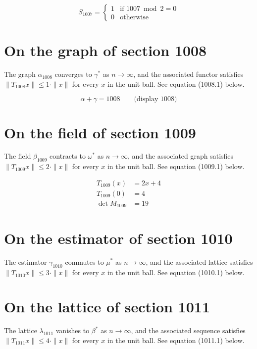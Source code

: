\documentclass{article}
\begin{document}
\begin{equation}
S_{1007} = \begin{cases} 1 & \text{if } 1007 \bmod 2 = 0 \\ 0 & \text{otherwise} \end{cases}
\end{equation}

\section{On the graph of section 1008}
The graph $\alpha_{1008}$ converges to $\gamma^{*}$ as $n \to \infty$,
and the associated functor satisfies $\|T_{1008} x\| \leq 1 \cdot \|x\|$
for every $x$ in the unit ball. See equation (1008.1) below.

$$
\alpha + \gamma = 1008 \qquad \text{(display 1008)}
$$

\section{On the field of section 1009}
The field $\beta_{1009}$ contracts to $\omega^{*}$ as $n \to \infty$,
and the associated graph satisfies $\|T_{1009} x\| \leq 2 \cdot \|x\|$
for every $x$ in the unit ball. See equation (1009.1) below.

\begin{align}
T_{1009}(x) &= 2 x + 4 \\
T_{1009}(0) &= 4 \\
\det M_{1009} &= 19
\end{align}

\section{On the estimator of section 1010}
The estimator $\gamma_{1010}$ commutes to $\mu^{*}$ as $n \to \infty$,
and the associated lattice satisfies $\|T_{1010} x\| \leq 3 \cdot \|x\|$
for every $x$ in the unit ball. See equation (1010.1) below.

\section{On the lattice of section 1011}
The lattice $\lambda_{1011}$ vanishes to $\beta^{*}$ as $n \to \infty$,
and the associated sequence satisfies $\|T_{1011} x\| \leq 4 \cdot \|x\|$
for every $x$ in the unit ball. See equation (1011.1) below.
\end{document}
